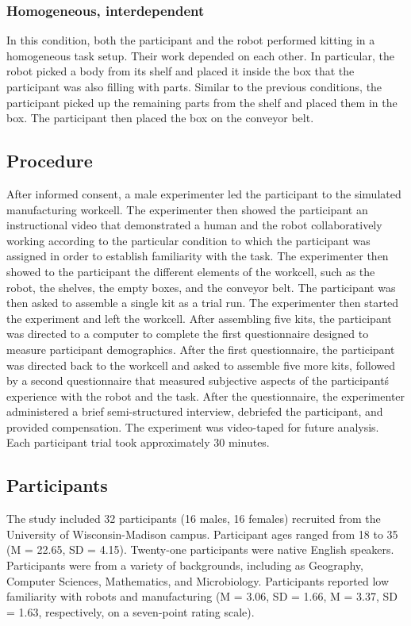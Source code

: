 \subsubsection{Homogeneous, interdependent} In this condition, both the participant and the robot performed kitting in a homogeneous task setup. Their work depended on each other. In particular, the robot picked a body from its shelf and placed it inside the box that the participant was also filling with parts. Similar to the previous conditions, the participant picked up the remaining parts from the shelf and placed them in the box. The participant then placed the box on the conveyor belt.
\subsection{Procedure}
       After informed consent, a male experimenter led the participant to the simulated manufacturing workcell. The experimenter then showed the participant an instructional video that demonstrated a human and the robot collaboratively working according to the particular condition to which the participant was assigned in order to establish familiarity with the task. The experimenter then showed to the participant the different elements of the workcell, such as the robot, the shelves, the empty boxes, and the conveyor belt. The participant was then asked to assemble a single kit as a trial run. The experimenter then started the experiment and left the workcell. After assembling five kits, the participant was directed to a computer to complete the first questionnaire designed to measure participant demographics. After the first questionnaire,  the participant was directed back to the workcell and asked to assemble five more kits, followed by a second questionnaire that measured subjective aspects of the participant\' s experience with the robot and the task. After the questionnaire, the experimenter administered a brief semi-structured interview, debriefed the participant, and provided compensation. The experiment was video-taped for future analysis. Each participant trial took approximately 30 minutes.
\subsection{Participants}
       The study included 32 participants (16 males, 16 females) recruited from the University of Wisconsin-Madison campus. Participant ages ranged from 18 to 35 (M = 22.65, SD = 4.15).
Twenty-one participants were native English speakers. Participants were from a variety of backgrounds, including as Geography, Computer Sciences, Mathematics, and Microbiology. Participants reported low familiarity with robots and manufacturing (M = 3.06, SD = 1.66, M = 3.37, SD = 1.63, respectively, on a seven-point rating scale).
